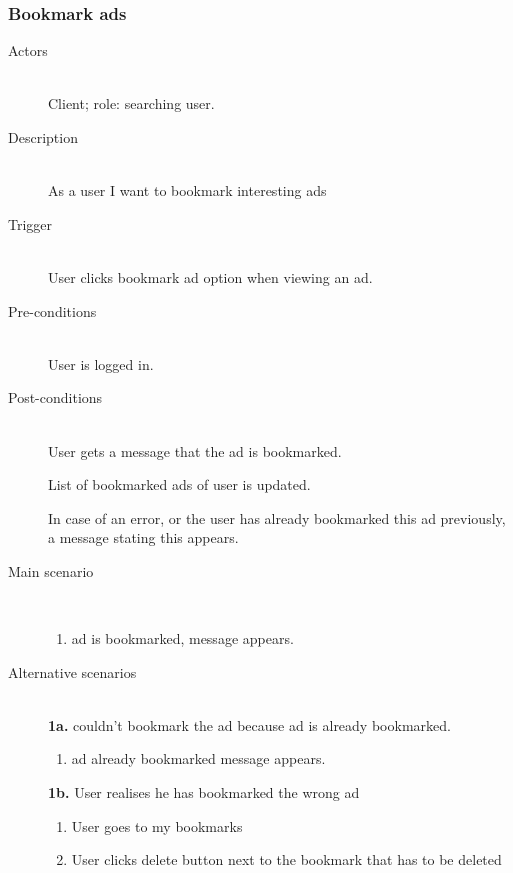 \documentclass[a4wide]{article}
\begin{document}
\subsubsection{Bookmark ads}
\begin{description}
\item[Actors]\mbox{}\\
Client; role: searching user.
\item[Description]\mbox{}\\
As a user I want to bookmark interesting ads
\item[Trigger]\mbox{}\\
User clicks bookmark ad option when viewing an ad.
\item[Pre-conditions]\mbox{}\\
User is logged in.
\item[Post-conditions]\mbox{}\\
User gets a message that the ad is bookmarked.

List of bookmarked ads of user is updated.

In case of an error, or the user has already bookmarked this ad previously, a message stating this appears.
\item[Main scenario]\mbox{}\\
\begin{enumerate}
\item ad is bookmarked, message appears.
\end{enumerate}
\item[Alternative scenarios]\mbox{}\\
\textbf{1a.} couldn’t bookmark the ad because ad is already bookmarked.
\begin{enumerate}
\item ad already bookmarked message appears.
\end{enumerate}
\textbf{1b.} User realises he has bookmarked the wrong ad
\begin{enumerate}
\item User goes to my bookmarks
\item User clicks delete button next to the bookmark that has to be deleted
\end{enumerate}
\end{description}
\end{document}
